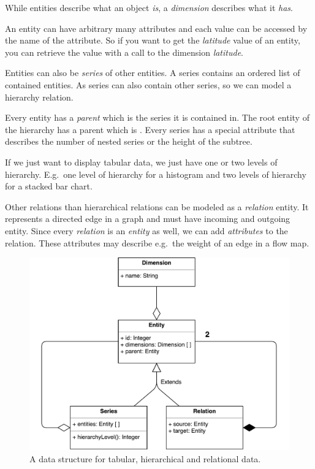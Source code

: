 While entities describe what an object \emph{is}, a \emph{dimension} describes what it \emph{has}.

An entity can have arbitrary many attributes and each value can be accessed by the name of the attribute.
So if you want to get the \emph{latitude} value of an entity, you can retrieve the value with a call to the dimension \emph{latitude}.

Entities can also be \emph{series} of other entities.
A series contains an ordered list of contained entities.
As series can also contain other series, so we can model a hierarchy relation.

Every entity has a \emph{parent} which is the series it is contained in.
The root entity of the hierarchy has a parent which is .
Every series has a special attribute  that describes the number of nested series or the height of the subtree.

If we just want to display tabular data, we just have one or two levels of hierarchy.
E.g.\ one level of hierarchy for a histogram and two levels of hierarchy for a stacked bar chart.

Other relations than hierarchical relations can be modeled as a \emph{relation} entity.
It represents a directed edge in a graph and must have incoming and outgoing entity.
Since every \emph{relation} is an \emph{entity} as well, we can add \emph{attributes} to the relation.
These attributes may describe e.g.\ the weight of an edge in a flow map.

\begin{figure}[ht]
  \centering
  \caption{%
    A data structure for tabular, hierarchical and relational data.
  }\label{fig:concept:shared-data-model}
  \includegraphics[width=\textwidth]{figures/concept/DataModel}
\end{figure}



